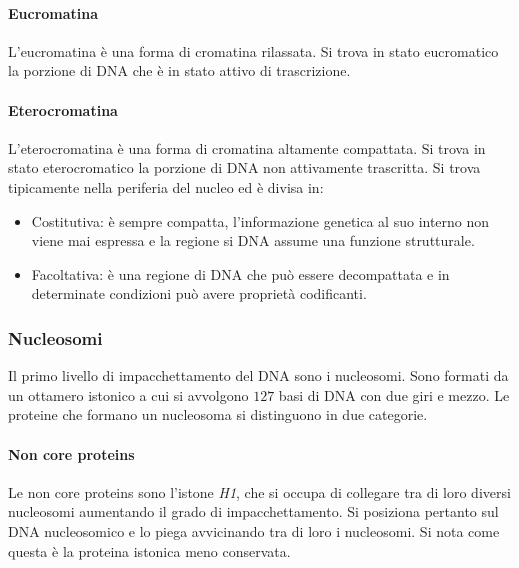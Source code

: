 			\paragraph{Eucromatina}
			L'eucromatina \`e una forma di cromatina rilassata.
			Si trova in stato eucromatico la porzione di DNA che \`e in stato attivo di trascrizione.

			\paragraph{Eterocromatina}
			L'eterocromatina \`e una forma di cromatina altamente compattata.
			Si trova in stato eterocromatico la porzione di DNA non attivamente trascritta.
			Si trova tipicamente nella periferia del nucleo ed \`e divisa in:
			\begin{multicols}{2}
				\begin{itemize}
					\item Costitutiva: \`e sempre compatta, l'informazione genetica al suo interno non viene mai espressa e la regione si DNA assume una funzione strutturale.
					\item Facoltativa: \`e una regione di DNA che pu\`o essere decompattata e in determinate condizioni pu\`o avere propriet\`a codificanti.
				\end{itemize}
			\end{multicols}
	
		\subsubsection{Nucleosomi}
		Il primo livello di impacchettamento del DNA sono i nucleosomi.
		Sono formati da un ottamero istonico a cui si avvolgono $127$ basi di DNA con due giri e mezzo.
		Le proteine che formano un nucleosoma si distinguono in due categorie.
		
			\paragraph{Non core proteins}
			Le non core proteins sono l'istone \emph{H1}, che si occupa di collegare tra di loro diversi nucleosomi aumentando il grado di impacchettamento.
			Si posiziona pertanto sul DNA nucleosomico e lo piega avvicinando tra di loro i nucleosomi.
			Si nota come questa \`e la proteina istonica meno conservata.

